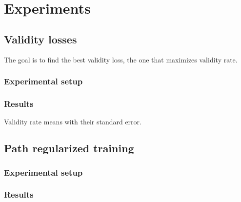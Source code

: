 \documentclass[../main.tex]{subfiles}
\begin{document}
\chapter{Experiments}

\section{Validity losses}

The goal is to find the best validity loss, the one that maximizes validity rate.

\subsection{Experimental setup}

\subsection{Results}

\begin{table}
    \caption{Validity rate means with their standard error.}
    
\end{table}

\section{Path regularized training}

\subsection{Experimental setup}

\subsection{Results}
\end{document}
